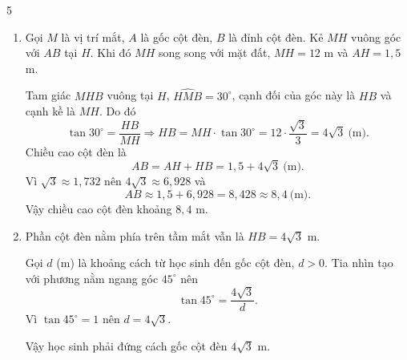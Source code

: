 \begin{Solbook}{5}
 \par \noindent  \begin {enumerate} \item Gọi $M$ là vị trí mắt, $A$ là gốc cột đèn, $B$ là đỉnh cột đèn. Kẻ $MH$ vuông góc với $AB$ tại $H$. Khi đó $MH$ song song với mặt đất, $MH=12$ m và $AH=1{,}5$ m. \par Tam giác $MHB$ vuông tại $H$, $\widehat {HMB}=30^\circ $, cạnh đối của góc này là $HB$ và cạnh kề là $MH$. Do đó \[ \tan 30^\circ =\dfrac {HB}{MH} \Rightarrow HB=MH\cdot \tan 30^\circ =12\cdot \dfrac {\sqrt {3}}{3}=4\sqrt {3}\ \text {(m)}. \] Chiều cao cột đèn là \[ AB=AH+HB=1{,}5+4\sqrt {3}\ \text {(m)}. \] Vì $\sqrt {3}\approx 1{,}732$ nên $4\sqrt {3}\approx 6{,}928$ và \[ AB\approx 1{,}5+6{,}928=8{,}428\approx 8{,}4\ \text {(m)}. \] Vậy chiều cao cột đèn khoảng $8{,}4$ m. \par \item Phần cột đèn nằm phía trên tầm mắt vẫn là $HB=4\sqrt {3}$ m. \par Gọi $d$ (m) là khoảng cách từ học sinh đến gốc cột đèn, $d>0$. Tia nhìn tạo với phương nằm ngang góc $45^\circ $ nên \[ \tan 45^\circ =\dfrac {4\sqrt {3}}{d}. \] Vì $\tan 45^\circ =1$ nên $d=4\sqrt {3}$. \par Vậy học sinh phải đứng cách gốc cột đèn $4\sqrt {3}$ m. \end {enumerate}  \hfill \qedEX 
\end{Solbook}
